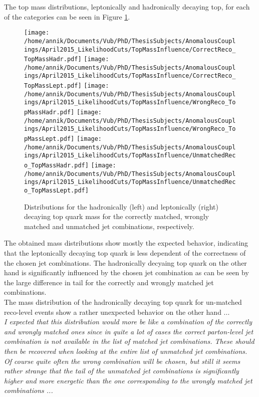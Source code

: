 The top mass distributions, leptonically and hadronically decaying top, for each of the categories can be seen in Figure \ref{fig::MTRecoDistr}.
\begin{figure}[h!t]
 \centering
 \texttt{[image: /home/annik/Documents/Vub/PhD/ThesisSubjects/AnomalousCouplings/April2015\_LikelihoodCuts/TopMassInfluence/CorrectReco\_TopMassHadr.pdf]}
 \texttt{[image: /home/annik/Documents/Vub/PhD/ThesisSubjects/AnomalousCouplings/April2015\_LikelihoodCuts/TopMassInfluence/CorrectReco\_TopMassLept.pdf]}
 \texttt{[image: /home/annik/Documents/Vub/PhD/ThesisSubjects/AnomalousCouplings/April2015\_LikelihoodCuts/TopMassInfluence/WrongReco\_TopMassHadr.pdf]}
 \texttt{[image: /home/annik/Documents/Vub/PhD/ThesisSubjects/AnomalousCouplings/April2015\_LikelihoodCuts/TopMassInfluence/WrongReco\_TopMassLept.pdf]}
 \texttt{[image: /home/annik/Documents/Vub/PhD/ThesisSubjects/AnomalousCouplings/April2015\_LikelihoodCuts/TopMassInfluence/UnmatchedReco\_TopMassHadr.pdf]}
 \texttt{[image: /home/annik/Documents/Vub/PhD/ThesisSubjects/AnomalousCouplings/April2015\_LikelihoodCuts/TopMassInfluence/UnmatchedReco\_TopMassLept.pdf]}
 \caption{Distributions for the hadronically (left) and leptonically (right) decaying top quark mass for the correctly matched, wrongly matched and unmatched jet combinations, respectively.}
 \label{fig::MTRecoDistr}
\end{figure}

The obtained mass distributions show mostly the expected behavior, indicating that the leptonically decaying top quark is less dependent of the correctness of the chosen jet combinations. The hadronically decyaing top quark on the other hand is significantly influenced by the chosen jet combination as can be seen by the large difference in tail for the correctly and wrongly matched jet combinations. \\

The mass distribution of the hadronically decaying top quark for un-matched reco-level events show a rather unexpected behavior on the other hand ...\\
\textit{I expected that this distribution would more be like a combination of the correctly and wrongly matched ones since in quite a lot of cases the correct parton-level jet combination is not available in the list of matched jet combinations. These should then be recovered when looking at the entire list of unmatched jet combinations. Of course quite often the wrong combination will be chosen, but still it seems rather strange that the tail of the unmatched jet combinations is significantly higher and more energetic than the one corresponding to the wrongly matched jet combinations ...}

